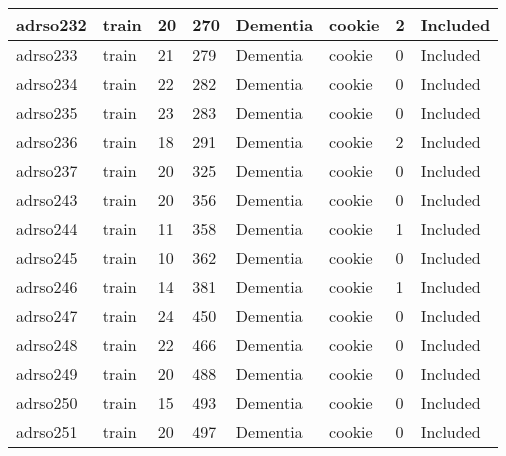 \begin{center}
\begin{longtable}{|l|l|l|l|l|l|l|l|}
adrso232  & train            & 20           & 270         & Dementia             & cookie          & 2                & Included      \\ \hline
adrso233  & train            & 21           & 279         & Dementia             & cookie          & 0                & Included      \\ \hline
adrso234  & train            & 22           & 282         & Dementia             & cookie          & 0                & Included      \\ \hline
adrso235  & train            & 23           & 283         & Dementia             & cookie          & 0                & Included      \\ \hline
adrso236  & train            & 18           & 291         & Dementia             & cookie          & 2                & Included      \\ \hline
adrso237  & train            & 20           & 325         & Dementia             & cookie          & 0                & Included      \\ \hline
adrso243  & train            & 20           & 356         & Dementia             & cookie          & 0                & Included      \\ \hline
adrso244  & train            & 11           & 358         & Dementia             & cookie          & 1                & Included      \\ \hline
adrso245  & train            & 10           & 362         & Dementia             & cookie          & 0                & Included      \\ \hline
adrso246  & train            & 14           & 381         & Dementia             & cookie          & 1                & Included      \\ \hline
adrso247  & train            & 24           & 450         & Dementia             & cookie          & 0                & Included      \\ \hline
adrso248  & train            & 22           & 466         & Dementia             & cookie          & 0                & Included      \\ \hline
adrso249  & train            & 20           & 488         & Dementia             & cookie          & 0                & Included      \\ \hline
adrso250  & train            & 15           & 493         & Dementia             & cookie          & 0                & Included      \\ \hline
adrso251  & train            & 20           & 497         & Dementia             & cookie          & 0                & Included      \\ \hline

\end{longtable}
\end{center}
